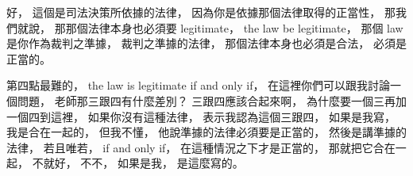 \hypertarget{w02:cue:1566}{}好，
\hypertarget{w02:cue:1567}{}這個是司法決策所依據的法律，
\hypertarget{w02:cue:1568}{}因為你是依據那個法律取得的正當性，
\hypertarget{w02:cue:1569}{}那我們就說，
\hypertarget{w02:cue:1570}{}那那個法律本身也必須要 legitimate，
\hypertarget{w02:cue:1571}{}the law be legitimate，
\hypertarget{w02:cue:1572}{}那個 law 是你作為裁判之準據，
\hypertarget{w02:cue:1573}{}裁判之準據的法律，
\hypertarget{w02:cue:1574}{}那個法律本身也必須是合法，
\hypertarget{w02:cue:1575}{}必須是正當的。

\hypertarget{w02:cue:1576}{}第四點最難的，
\hypertarget{w02:cue:1577}{}the law is legitimate if and only if，
\hypertarget{w02:cue:1578}{}在這裡你們可以跟我討論一個問題，
\hypertarget{w02:cue:1579}{}老師那三跟四有什麼差別？
\hypertarget{w02:cue:1580}{}三跟四應該合起來啊，
\hypertarget{w02:cue:1581}{}為什麼要一個三再加一個四到這裡，
\hypertarget{w02:cue:1582}{}如果你沒有這種法律，
\hypertarget{w02:cue:1583}{}表示我認為這個三跟四，
\hypertarget{w02:cue:1584}{}如果是我寫，
\hypertarget{w02:cue:1585}{}我是合在一起的，
\hypertarget{w02:cue:1586}{}但我不懂，
\hypertarget{w02:cue:1587}{}他說準據的法律必須要是正當的，
\hypertarget{w02:cue:1588}{}然後是講準據的法律，
\hypertarget{w02:cue:1589}{}若且唯若，
\hypertarget{w02:cue:1590}{}if and only if，
\hypertarget{w02:cue:1591}{}在這種情況之下才是正當的，
\hypertarget{w02:cue:1592}{}那就把它合在一起，
\hypertarget{w02:cue:1593}{}不就好，
\hypertarget{w02:cue:1594}{}不不，
\hypertarget{w02:cue:1595}{}如果是我，
\hypertarget{w02:cue:1596}{}是這麼寫的。

